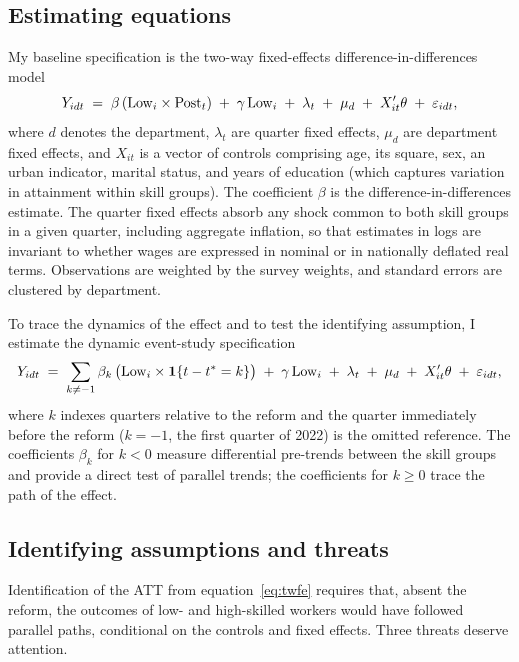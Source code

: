 \subsection{Estimating equations}

My baseline specification is the two-way fixed-effects difference-in-differences model
\begin{equation}
Y_{idt} \;=\; \beta\,(\mathrm{Low}_i\times\mathrm{Post}_t) \;+\; \gamma\,\mathrm{Low}_i \;+\; \lambda_t \;+\; \mu_d
\;+\; X_{it}'\theta \;+\; \varepsilon_{idt},
\label{eq:twfe}
\end{equation}
where $d$ denotes the department, $\lambda_t$ are quarter fixed effects, $\mu_d$ are
department fixed effects, and $X_{it}$ is a vector of controls comprising age, its square,
sex, an urban indicator, marital status, and years of education (which captures variation
in attainment within skill groups). The coefficient $\beta$ is the difference-in-differences
estimate. The quarter fixed effects absorb any shock common to both skill groups in a given
quarter, including aggregate inflation, so that estimates in logs are invariant to whether
wages are expressed in nominal or in nationally deflated real terms. Observations are
weighted by the survey weights, and standard errors are clustered by department.

To trace the dynamics of the effect and to test the identifying assumption, I estimate the
dynamic event-study specification
\begin{equation}
Y_{idt} \;=\; \sum_{k\neq -1}\beta_k\,\bigl(\mathrm{Low}_i\times\mathbf{1}\{t-t^{\ast}=k\}\bigr)
\;+\; \gamma\,\mathrm{Low}_i \;+\; \lambda_t \;+\; \mu_d \;+\; X_{it}'\theta \;+\; \varepsilon_{idt},
\label{eq:event}
\end{equation}
where $k$ indexes quarters relative to the reform and the quarter immediately before the
reform ($k=-1$, the first quarter of 2022) is the omitted reference. The coefficients
$\beta_k$ for $k<0$ measure differential pre-trends between the skill groups and provide a
direct test of parallel trends; the coefficients for $k\ge 0$ trace the path of the effect.

\subsection{Identifying assumptions and threats}

Identification of the ATT from equation~\eqref{eq:twfe} requires that, absent the reform, the
outcomes of low- and high-skilled workers would have followed parallel paths, conditional on
the controls and fixed effects. Three threats deserve attention.

